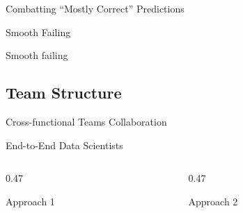 \begin{frame}{Combatting ``Mostly Correct'' Predictions}
  \begin{sidebody}
  \end{sidebody}
\end{frame}

\begin{frame}{Smooth Failing}
  \begin{tddef}{Smooth failing}
  \end{tddef}
  \begin{takeaway}
  \end{takeaway}
\end{frame}

\subsection{Team Structure}

\begin{frame}{Cross-functional Teams Collaboration}
  \begin{withmargin}
    \begin{tdmain}
    \end{tdmain}
    \begin{tdmargin}
    \end{tdmargin}
  \end{withmargin}
\end{frame}

\begin{frame}{End-to-End Data Scientists}
  \begin{columns}[T,onlytextwidth]
    \begin{column}{0.47\textwidth}
      \begin{tdblockt}[equal height group=e2e]{Approach 1}
      \end{tdblockt}
    \end{column}
    \begin{column}{0.47\textwidth}
      \begin{tdblockt}[equal height group=e2e]{Approach 2}
      \end{tdblockt}
    \end{column}
  \end{columns}
\end{frame}

